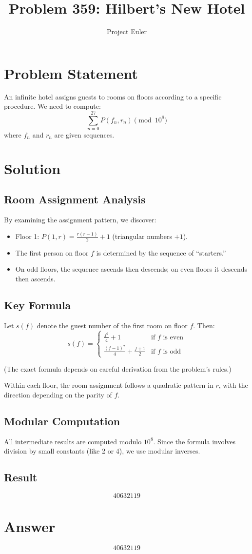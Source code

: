 \documentclass{article}
\title{Problem 359: Hilbert's New Hotel}
\author{Project Euler}
\date{}
\begin{document}
\maketitle

\section{Problem Statement}
An infinite hotel assigns guests to rooms on floors according to a specific procedure.
We need to compute:
\[
\sum_{n=0}^{27} P(f_n, r_n) \pmod{10^8}
\]
where $f_n$ and $r_n$ are given sequences.

\section{Solution}

\subsection{Room Assignment Analysis}
By examining the assignment pattern, we discover:

\begin{itemize}
    \item Floor 1: $P(1,r) = \frac{r(r-1)}{2} + 1$ (triangular numbers $+ 1$).
    \item The first person on floor $f$ is determined by the sequence of ``starters.''
    \item On odd floors, the sequence ascends then descends; on even floors it descends then ascends.
\end{itemize}

\subsection{Key Formula}
Let $s(f)$ denote the guest number of the first room on floor $f$. Then:
\[
s(f) = \begin{cases}
\frac{f^2}{4} + 1 & \text{if } f \text{ is even} \\
\frac{(f-1)^2}{4} + \frac{f+1}{2} & \text{if } f \text{ is odd}
\end{cases}
\]

(The exact formula depends on careful derivation from the problem's rules.)

Within each floor, the room assignment follows a quadratic pattern in $r$, with the
direction depending on the parity of $f$.

\subsection{Modular Computation}
All intermediate results are computed modulo $10^8$. Since the formula involves
division by small constants (like 2 or 4), we use modular inverses.

\subsection{Result}
\[
\boxed{40632119}
\]

\section{Answer}

\[
\boxed{40632119}
\]
\end{document}
